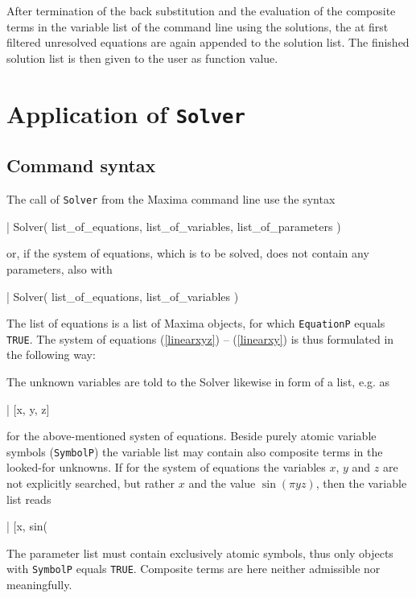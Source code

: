 After termination of the back substitution and the evaluation of the composite terms in the variable list of the command line using the solutions, the at first filtered unresolved equations are again appended to the solution list. The finished solution list is then given to the user as function value.


\section{Application of {\tt Solver}}  %

\subsection{Command syntax}

The call of  {\tt Solver} from the Maxima command line use the syntax

\begin{literatim}{|}
    Solver( list_of_equations, list_of_variables, list_of_parameters )
\end{literatim}
or, if the system of equations, which is to be solved, does not contain any parameters, also with
\begin{literatim}{|}
    Solver( list_of_equations, list_of_variables )
\end{literatim}
The list of   equations is a list of Maxima objects, for which \verb+EquationP+ equals \verb+TRUE+. The system of equations
(\ref{linearxyz}) -- (\ref{linearxy}) is thus formulated in the following way:
The unknown variables are told to the Solver likewise in form of a list, e.g. as
\begin{literatim}{|}
     [x, y, z]
\end{literatim}
for the above-mentioned systen of equations. Beside purely atomic variable symbols  (\verb+SymbolP+) the variable list may contain  also composite terms in the looked-for unknowns. If for the system of equations  the variables $x$, $y$ 
and $z$ are not explicitly searched, but rather $x$ and the value  $\sin(\pi yz)$, then the variable list reads
\begin{literatim}{|}
     [x, sin(%
\end{literatim}

The parameter list must contain exclusively atomic symbols, thus only objects with  \verb+SymbolP+ equals \verb+TRUE+. 
Composite terms are here neither admissible nor meaningfully.

